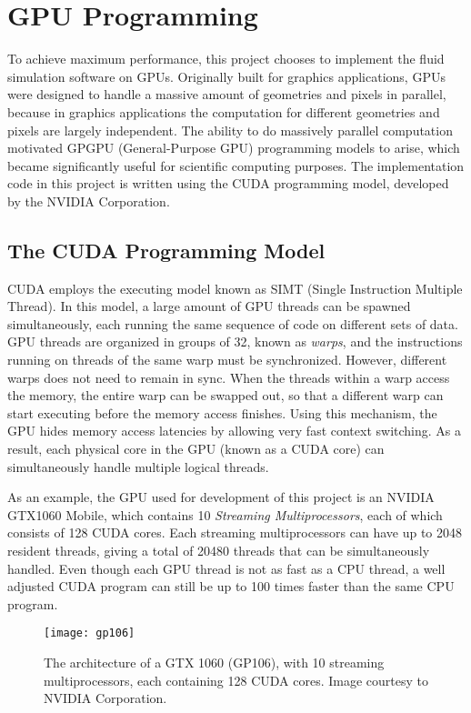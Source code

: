 \chapter{GPU Programming}

To achieve maximum performance, this project chooses to implement the fluid simulation software on GPUs. Originally built for graphics applications, GPUs were designed to handle a massive amount of geometries and pixels in parallel, because in graphics applications the computation for different geometries and pixels are largely independent. The ability to do massively parallel computation motivated GPGPU (General-Purpose GPU) programming models to arise, which became significantly useful for scientific computing purposes. The implementation code in this project is written using the CUDA programming model, developed by the NVIDIA Corporation.

\section{The CUDA Programming Model}
CUDA employs the executing model known as SIMT (Single Instruction Multiple Thread). In this model, a large amount of GPU threads can be spawned simultaneously, each running the same sequence of code on different sets of data. GPU threads are organized in groups of 32, known as \textit{warps}, and the instructions running on threads of the same warp must be synchronized. However, different warps does not need to remain in sync. When the threads within a warp access the memory, the entire warp can be swapped out, so that a different warp can start executing before the memory access finishes. Using this mechanism, the GPU hides memory access latencies by allowing very fast context switching. As a result, each physical core in the GPU (known as a CUDA core) can simultaneously handle multiple logical threads.

As an example, the GPU used for development of this project is an NVIDIA GTX1060 Mobile, which contains 10 \textit{Streaming Multiprocessors}, each of which consists of 128 CUDA cores. Each streaming multiprocessors can have up to 2048 resident threads, giving a total of 20480 threads that can be simultaneously handled. Even though each GPU thread is not as fast as a CPU thread, a well adjusted CUDA program can still be up to 100 times faster than the same CPU program.


\begin{figure}[h]
    \centering
    \texttt{[image: gp106]}
    \caption{The architecture of a GTX 1060 (GP106), with 10 streaming multiprocessors, each containing 128 CUDA cores. Image courtesy to NVIDIA Corporation.}
    \label{figure GTX1060}
\end{figure}



